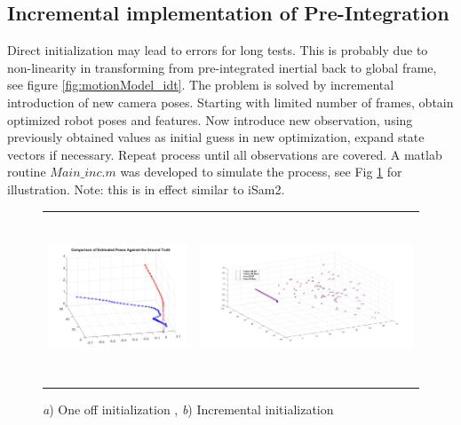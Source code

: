 \documentclass[12pt]{article}   %
\begin{document}
\subsection{Incremental implementation of Pre-Integration}
Direct initialization may lead to errors for long tests. This is probably due to non-linearity in transforming from pre-integrated inertial back to global frame, see figure \ref{fig:motionModel_idt}. The problem is solved by incremental introduction of new camera poses. Starting with limited number of frames, obtain optimized robot poses and features. Now introduce new observation, using previously obtained values as initial guess in new optimization, expand state vectors if necessary. Repeat process until all observations are covered. A matlab routine $Main\_inc.m$ was developed to simulate the process, see Fig \ref{fig:preint_init} for illustration. Note: this is in effect similar to iSam2.

	\begin{figure}[h!]
		\begin{center}\begin{tabular}{cc}
				\includegraphics[height=5cm]{figures/simuNpose_error.png} &
				\includegraphics[height=5cm]{Figures/Final_pose-feature_3D_GT-vs-SLAM.jpg}\\				
			\end{tabular}\end{center}
			\caption{\emph{a}) One off initialization , \emph{b}) Incremental initialization } 
			\label{fig:preint_init}
	\end{figure} 
\end{document}
